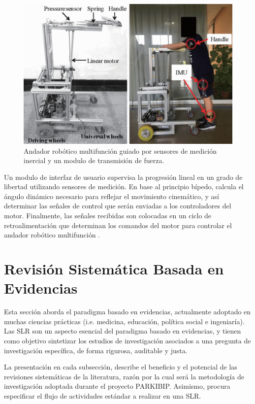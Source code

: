 \begin{figure}[H]
\includegraphics[width=\textwidth]{TESIS/imagenes/chap02/AplWalkerRobotic2.png}
\caption{ Andador robótico multifunción guiado por sensores de medición inercial y un modulo de transmisión de fuerza. \cite{walker8688067}}
\label{fig:robotic_walker}
\end{figure}

Un modulo de interfaz de usuario supervisa la progresión lineal en un grado de libertad utilizando sensores de medición. En base al principio bípedo, calcula el ángulo dinámico necesario para reflejar el movimiento cinemático, y así determinar las señales de control que serán enviadas a los controladores del motor. Finalmente, las señales recibidas son colocadas en un ciclo de retroalimentación que determinan los comandos del motor para controlar el andador robótico multifunción \cite{Modise2016}.

\section{Revisión Sistemática Basada en Evidencias} \label{fundamentos:RSBE}

Esta sección aborda el paradigma basado en evidencias, actualmente adoptado en muchas ciencias prácticas (i.e. medicina, educación, política social e ingeniaría). Las \gls{SLR} son un aspecto esencial del paradigma basado en evidencias, y tienen como objetivo sintetizar los estudios de investigación asociados a una pregunta de investigación específica, de forma rigurosa, auditable y justa. 

La presentación en cada subsección, describe el beneficio y el potencial de las revisiones sistemáticas de la literatura, razón por la cual será la metodología de investigación adoptada durante el proyecto PARKIBIP. Asimismo, procura especificar el flujo de actividades estándar a realizar en una SLR.

